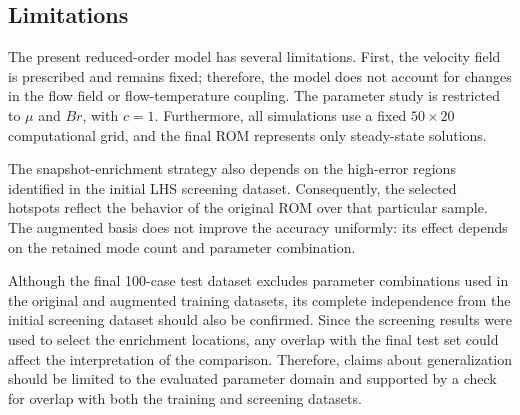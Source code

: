 \subsection{Limitations}
\label{subsec:limitations}

The present reduced-order model has several limitations.
First, the velocity field is prescribed and remains fixed;
therefore, the model does not account for changes in the
flow field or flow-temperature coupling. The parameter
study is restricted to $\mu$ and $Br$, with $c=1$.
Furthermore, all simulations use a fixed $50\times20$
computational grid, and the final ROM represents only
steady-state solutions.

The snapshot-enrichment strategy also depends on the
high-error regions identified in the initial LHS
screening dataset. Consequently, the selected hotspots
reflect the behavior of the original ROM over that
particular sample. The augmented basis does not improve
the accuracy uniformly: its effect depends on the
retained mode count and parameter combination.

Although the final 100-case test dataset excludes
parameter combinations used in the original and
augmented training datasets, its complete independence
from the initial screening dataset should also be
confirmed. Since the screening results were used to
select the enrichment locations, any overlap with the
final test set could affect the interpretation of the
comparison. Therefore, claims about generalization
should be limited to the evaluated parameter domain
and supported by a check for overlap with both the
training and screening datasets.
